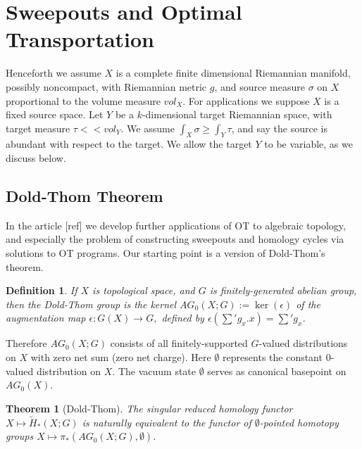 \documentclass[12pt]{amsart}
\newtheorem*{thm}{Theorem}
\newtheorem{dfn}{Definition}
\theoremstyle{remark}
\begin{document}





\section{Sweepouts and Optimal Transportation}
Henceforth we assume $X$ is a complete finite dimensional Riemannian manifold, possibly noncompact, with Riemannian metric $g$, and source measure $\sigma$ on $X$ proportional to the volume measure $vol_X$. For applications we suppose $X$ is a fixed source space. Let $Y$ be a $k$-dimensional target Riemannian space, with target measure $\tau<<vol_Y$. We assume $\int_X \sigma \geq \int_Y \tau$, and say the source is abundant with respect to the target. We allow the target $Y$ to be variable, as we discuss below.



\subsection{Dold-Thom Theorem}
In the article [ref] we develop further applications of OT to algebraic topology, and especially the problem of constructing sweepouts and homology cycles via solutions to OT programs. Our starting point is a version of Dold-Thom's theorem. 

\begin{dfn} If $X$ is topological space, and $G$ is finitely-generated abelian group, then the Dold-Thom group is the kernel $AG_0(X;G):=\ker(\epsilon)$ of the augmentation map $\epsilon: G(X) \to G,$ defined by $\epsilon(\sum' g_x .x)=\sum' g_x$. 
\end{dfn}

Therefore $AG_0(X;G)$ consists of all finitely-supported $G$-valued distributions on $X$ with zero net sum (zero net charge). Here $\emptyset$ represents the constant $0$-valued distribution on $X$. The vacuum state $\emptyset$ serves as canonical basepoint on $AG_0(X)$.

\begin{thm}[Dold-Thom]
The singular reduced homology functor $X\mapsto \tilde{H}_*(X;G)$ is naturally equivalent to the functor of $\emptyset$-pointed homotopy groups $X\mapsto \pi_*(AG_0(X;G), \emptyset)$.
\end{thm}
\end{document}
